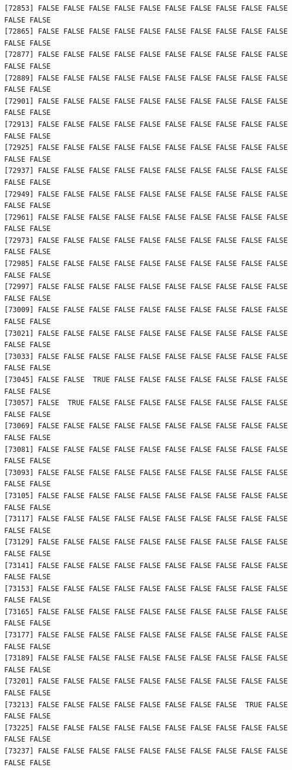 \documentclass[
  a4paper,
  DIV=11,
  numbers=noendperiod]{scrartcl}
\begin{document}
\begin{verbatim}
[72853] FALSE FALSE FALSE FALSE FALSE FALSE FALSE FALSE FALSE FALSE FALSE FALSE
[72865] FALSE FALSE FALSE FALSE FALSE FALSE FALSE FALSE FALSE FALSE FALSE FALSE
[72877] FALSE FALSE FALSE FALSE FALSE FALSE FALSE FALSE FALSE FALSE FALSE FALSE
[72889] FALSE FALSE FALSE FALSE FALSE FALSE FALSE FALSE FALSE FALSE FALSE FALSE
[72901] FALSE FALSE FALSE FALSE FALSE FALSE FALSE FALSE FALSE FALSE FALSE FALSE
[72913] FALSE FALSE FALSE FALSE FALSE FALSE FALSE FALSE FALSE FALSE FALSE FALSE
[72925] FALSE FALSE FALSE FALSE FALSE FALSE FALSE FALSE FALSE FALSE FALSE FALSE
[72937] FALSE FALSE FALSE FALSE FALSE FALSE FALSE FALSE FALSE FALSE FALSE FALSE
[72949] FALSE FALSE FALSE FALSE FALSE FALSE FALSE FALSE FALSE FALSE FALSE FALSE
[72961] FALSE FALSE FALSE FALSE FALSE FALSE FALSE FALSE FALSE FALSE FALSE FALSE
[72973] FALSE FALSE FALSE FALSE FALSE FALSE FALSE FALSE FALSE FALSE FALSE FALSE
[72985] FALSE FALSE FALSE FALSE FALSE FALSE FALSE FALSE FALSE FALSE FALSE FALSE
[72997] FALSE FALSE FALSE FALSE FALSE FALSE FALSE FALSE FALSE FALSE FALSE FALSE
[73009] FALSE FALSE FALSE FALSE FALSE FALSE FALSE FALSE FALSE FALSE FALSE FALSE
[73021] FALSE FALSE FALSE FALSE FALSE FALSE FALSE FALSE FALSE FALSE FALSE FALSE
[73033] FALSE FALSE FALSE FALSE FALSE FALSE FALSE FALSE FALSE FALSE FALSE FALSE
[73045] FALSE FALSE  TRUE FALSE FALSE FALSE FALSE FALSE FALSE FALSE FALSE FALSE
[73057] FALSE  TRUE FALSE FALSE FALSE FALSE FALSE FALSE FALSE FALSE FALSE FALSE
[73069] FALSE FALSE FALSE FALSE FALSE FALSE FALSE FALSE FALSE FALSE FALSE FALSE
[73081] FALSE FALSE FALSE FALSE FALSE FALSE FALSE FALSE FALSE FALSE FALSE FALSE
[73093] FALSE FALSE FALSE FALSE FALSE FALSE FALSE FALSE FALSE FALSE FALSE FALSE
[73105] FALSE FALSE FALSE FALSE FALSE FALSE FALSE FALSE FALSE FALSE FALSE FALSE
[73117] FALSE FALSE FALSE FALSE FALSE FALSE FALSE FALSE FALSE FALSE FALSE FALSE
[73129] FALSE FALSE FALSE FALSE FALSE FALSE FALSE FALSE FALSE FALSE FALSE FALSE
[73141] FALSE FALSE FALSE FALSE FALSE FALSE FALSE FALSE FALSE FALSE FALSE FALSE
[73153] FALSE FALSE FALSE FALSE FALSE FALSE FALSE FALSE FALSE FALSE FALSE FALSE
[73165] FALSE FALSE FALSE FALSE FALSE FALSE FALSE FALSE FALSE FALSE FALSE FALSE
[73177] FALSE FALSE FALSE FALSE FALSE FALSE FALSE FALSE FALSE FALSE FALSE FALSE
[73189] FALSE FALSE FALSE FALSE FALSE FALSE FALSE FALSE FALSE FALSE FALSE FALSE
[73201] FALSE FALSE FALSE FALSE FALSE FALSE FALSE FALSE FALSE FALSE FALSE FALSE
[73213] FALSE FALSE FALSE FALSE FALSE FALSE FALSE FALSE  TRUE FALSE FALSE FALSE
[73225] FALSE FALSE FALSE FALSE FALSE FALSE FALSE FALSE FALSE FALSE FALSE FALSE
[73237] FALSE FALSE FALSE FALSE FALSE FALSE FALSE FALSE FALSE FALSE FALSE FALSE

\end{verbatim}
\end{document}
